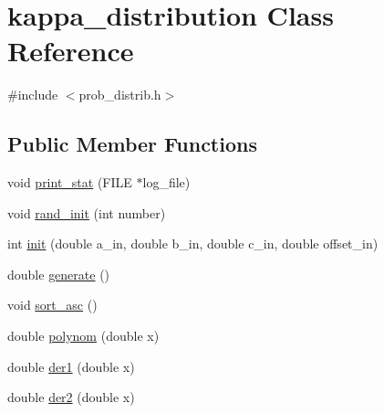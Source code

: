 \hypertarget{classkappa__distribution}{}\section{kappa\+\_\+distribution Class Reference}
\label{classkappa__distribution}


{\ttfamily \#include $<$prob\+\_\+distrib.\+h$>$}

\subsection*{Public Member Functions}
\begin{DoxyCompactItemize}
\item 
void \hyperlink{classkappa__distribution_abf97127e675e370e41c20a4bcf3920ce}{print\+\_\+stat} (F\+I\+LE $\ast$log\+\_\+file)
\item 
void \hyperlink{classkappa__distribution_a5e943b080c0c8a88e37a85100666cadb}{rand\+\_\+init} (int number)
\item 
int \hyperlink{classkappa__distribution_aaf5ceb9a7a92cd7cdb4ca07cf0f74388}{init} (double a\+\_\+in, double b\+\_\+in, double c\+\_\+in, double offset\+\_\+in)
\item 
double \hyperlink{classkappa__distribution_af8f5aef5827c9423c2d9c65a53a43202}{generate} ()
\item 
void \hyperlink{classkappa__distribution_ab18b8d4b45ba749340829da1ca18130c}{sort\+\_\+asc} ()
\item 
double \hyperlink{classkappa__distribution_a7e0171752a4a1c1b8b99950394281922}{polynom} (double x)
\item 
double \hyperlink{classkappa__distribution_ae7fee7da2f235cf8d319e00a7f8a4dc3}{der1} (double x)
\item 
double \hyperlink{classkappa__distribution_aafde4b907d4e201a59e3706ef5cb7c53}{der2} (double x)
\end{DoxyCompactItemize}
